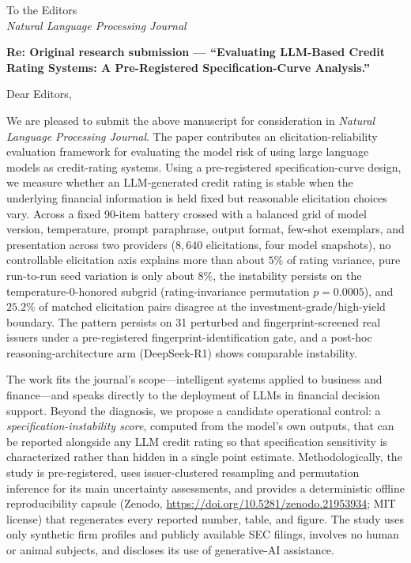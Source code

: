 \documentclass[11pt]{article}
\begin{document}
\noindent To the Editors\\
\emph{Natural Language Processing Journal}

\vspace{6pt}
\noindent\textbf{Re: Original research submission --- ``Evaluating LLM-Based Credit Rating Systems: A Pre-Registered Specification-Curve Analysis.''}

\vspace{6pt}
\noindent Dear Editors,

We are pleased to submit the above manuscript for consideration in \emph{Natural Language Processing Journal}. The paper contributes an elicitation-reliability evaluation framework for evaluating the model risk of using large language models as credit-rating systems. Using a pre-registered specification-curve design, we measure whether an LLM-generated credit rating is stable when the underlying financial information is held fixed but reasonable elicitation choices vary. Across a fixed 90-item battery crossed with a balanced grid of model version, temperature, prompt paraphrase, output format, few-shot exemplars, and presentation across two providers ($8{,}640$ elicitations, four model snapshots), no controllable elicitation axis explains more than about $5\%$ of rating variance, pure run-to-run seed variation is only about $8\%$, the instability persists on the temperature-0-honored subgrid (rating-invariance permutation $p=0.0005$), and $25.2\%$ of matched elicitation pairs disagree at the investment-grade/high-yield boundary. The pattern persists on 31 perturbed and fingerprint-screened real issuers under a pre-registered fingerprint-identification gate, and a post-hoc reasoning-architecture arm (DeepSeek-R1) shows comparable instability.

The work fits the journal's scope---intelligent systems applied to business and finance---and speaks directly to the deployment of LLMs in financial decision support. Beyond the diagnosis, we propose a candidate operational control: a \emph{specification-instability score}, computed from the model's own outputs, that can be reported alongside any LLM credit rating so that specification sensitivity is characterized rather than hidden in a single point estimate. Methodologically, the study is pre-registered, uses issuer-clustered resampling and permutation inference for its main uncertainty assessments, and provides a deterministic offline reproducibility capsule (Zenodo, \url{https://doi.org/10.5281/zenodo.21953934}; MIT license) that regenerates every reported number, table, and figure. The study uses only synthetic firm profiles and publicly available SEC filings, involves no human or animal subjects, and discloses its use of generative-AI assistance.
\end{document}
